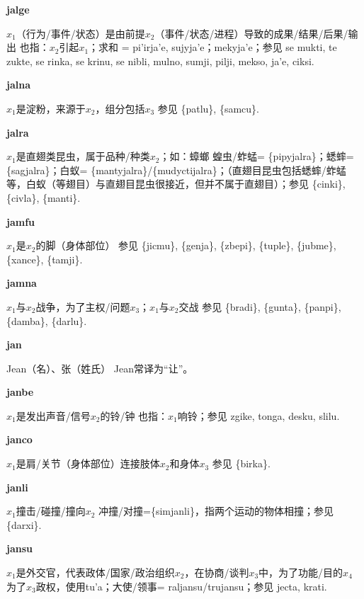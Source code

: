 \documentclass[notitlepage,twocolumn,a4paper,10pt]{book}
\begin{document}
{{\sffamily\bfseries jalge}\enspace {\ttfamily\bfseries[jag     ja'e]}  $x_1$（行为\slash{}事件\slash{}状态）是由前提$x_2$（事件\slash{}状态\slash{}进程）导致的成果\slash{}结果\slash{}后果\slash{}输出 \textemdash{} 也指：$x_2$引起$x_1$；求和 = {pi'irja'e}, {sujyja'e}；{mekyja'e}；参见 se {mukti}, te {zukte}, se {rinka}, se {krinu}, se {nibli}, {mulno}, {sumji}, {pilji}, {mekso}, {ja'e}, {ciksi}.

{\sffamily\bfseries jalna} $x_1$是淀粉，来源于$x_2$，组分包括$x_3$ \textemdash{} 参见 \{patlu\}, \{samcu\}.

{\sffamily\bfseries jalra} $x_1$是直翅类昆虫，属于品种\slash{}种类$x_2$；如：蟑螂 \textemdash{} 蝗虫\slash{}蚱蜢= \{pipyjalra\}；蟋蟀= \{sagjalra\}；白蚁= \{mantyjalra\}\slash{}\{mudyctijalra\}；（直翅目昆虫包括蟋蟀\slash{}蚱蜢等，白蚁（等翅目）与直翅目昆虫很接近，但并不属于直翅目）；参见 \{cinki\}, \{civla\}, \{manti\}.

{\sffamily\bfseries jamfu}  $x_1$是$x_2$的脚（身体部位） \textemdash{} 参见 \{jicmu\}, \{genja\}, \{zbepi\}, \{tuple\}, \{jubme\}, \{xance\}, \{tamji\}.

{\sffamily\bfseries jamna}\enspace {\ttfamily\bfseries[jam]}  $x_1$与$x_2$战争，为了主权\slash{}问题$x_3$；$x_1$与$x_2$交战 \textemdash{} 参见 \{bradi\}, \{gunta\}, \{panpi\}, \{damba\}, \{darlu\}.

{\sffamily\bfseries jan} Jean（名）、张（姓氏） \textemdash{} Jean常译为“让”。

{\sffamily\bfseries janbe}\enspace {\ttfamily\bfseries[jab]}  $x_1$是发出声音\slash{}信号$x_2$的铃\slash{}钟 \textemdash{} 也指：$x_1$响铃；参见 {zgike}, {tonga}, {desku}, {slilu}.

{\sffamily\bfseries janco}\enspace {\ttfamily\bfseries[jan]}  $x_1$是肩\slash{}关节（身体部位）连接肢体$x_2$和身体$x_3$ \textemdash{} 参见 \{birka\}.

{\sffamily\bfseries janli}\enspace {\ttfamily\bfseries[jal]}  $x_1$撞击\slash{}碰撞\slash{}撞向$x_2$ \textemdash{} 冲撞\slash{}对撞=\{simjanli\}，指两个运动的物体相撞；参见 \{darxi\}.

{\sffamily\bfseries jansu}\enspace {\ttfamily\bfseries[jas]}  $x_1$是外交官，代表政体\slash{}国家\slash{}政治组织$x_2$，在协商\slash{}谈判$x_3$中，为了功能\slash{}目的$x_4$ \textemdash{} 为了$x_3$政权，使用tu'a；大使\slash{}领事= {raljansu}\slash{}{trujansu}；参见 {jecta}, {krati}.

}
\end{document}
